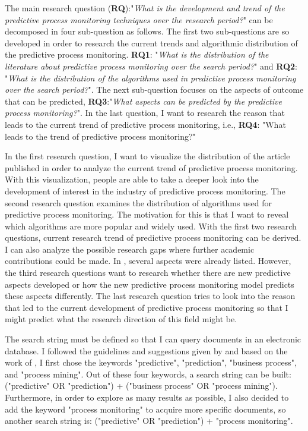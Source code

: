 \documentclass[runningheads]{llncs}
\begin{document}
		The main research question (\textbf{RQ}):"\textit{What is the development and trend of the predictive process monitoring techniques over the research period?}" can be decomposed in four sub-question as follows. The first two sub-questions are so developed in order to research the current trends and algorithmic distribution of the predictive process monitoring. \textbf{RQ1}: "\textit{What is the distribution of the literature about predictive process monitoring over the search period?}" and \textbf{RQ2}: "\textit{What is the distribution of the algorithms used in predictive process monitoring over the search period?}". The next sub-question focuses on the aspects of outcome that can be predicted, \textbf{RQ3}:"\textit{What aspects can be predicted by the predictive process monitoring?}". In the last question, I want to research the reason that leads to the current trend of predictive process monitoring, i.e., \textbf{RQ4}: "What leads to the trend of predictive process monitoring?"
		
		In the first research question, I want to visualize the distribution of the article published in order to analyze the current trend of predictive process monitoring. With this visualization, people are able to take a deeper look into the development of interest in the industry of predictive process monitoring. The second research question examines the distribution of algorithms used for predictive process monitoring. The motivation for this is that I want to reveal which algorithms are more popular and widely used. With the first two research questions, current research trend of predictive process monitoring can be derived. I can also analyze the possible research gaps where further academic contributions could be made. In \cite{ref1}, several aspects were already listed. However, the third research questions want to research whether there are new predictive aspects developed or how the new predictive process monitoring model predicts these aspects differently. The last research question tries to look into the reason that led to the current development of predictive process monitoring so that I might predict what the research direction of this field might be.
		
		The search string must be defined so that I can query documents in an electronic database. I followed the guidelines and suggestions given by \cite{ref2} and based on the work of \cite{ref1}, I first chose the keywords "predictive", "prediction", "business process", and "process mining". Out of these four keywords, a search string can be built: ("predictive" OR "prediction") + ("business process" OR "process mining"). Furthermore, in order to explore as many results as possible, I also decided to add the keyword "process monitoring" to acquire more specific documents, so another search string is: ("predictive" OR "prediction") + "process monitoring". 
		
\end{document}
